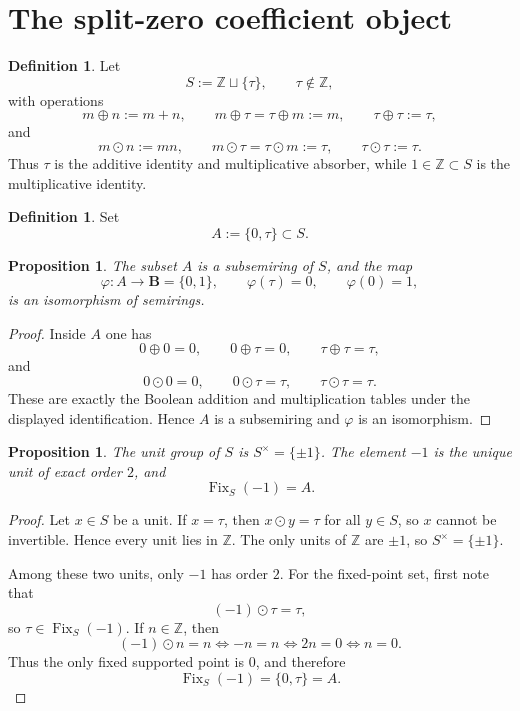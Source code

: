 \documentclass[11pt,a4paper]{article}
\newtheorem{proposition}[theorem]{Proposition}
\theoremstyle{definition}
\newtheorem{definition}[theorem]{Definition}
\theoremstyle{remark}
\DeclareMathOperator{\Fix}{Fix}
\newcommand{\ZZ}{\mathbb Z}
\newcommand{\BB}{\mathbf B}
\newcommand{\taup}{\tau}
\begin{document}
\section{The split-zero coefficient object}

\begin{definition}
Let
\[
S:=\ZZ\sqcup\{\taup\},\qquad \taup\notin \ZZ,
\]
with operations
\[
m\oplus n:=m+n,
\qquad
m\oplus\taup=\taup\oplus m:=m,
\qquad
\taup\oplus\taup:=\taup,
\]
and
\[
m\odot n:=mn,
\qquad
m\odot\taup=\taup\odot m:=\taup,
\qquad
\taup\odot\taup:=\taup.
\]
Thus $\taup$ is the additive identity and multiplicative absorber, while $1\in\ZZ\subset S$ is the multiplicative identity.
\end{definition}

\begin{definition}
Set
\[
A:=\{0,\taup\}\subset S.
\]
\end{definition}

\begin{proposition}\label{prop:boolean-pair}
The subset $A$ is a subsemiring of $S$, and the map
\[
\varphi:A\longrightarrow \BB=\{0,1\},
\qquad
\varphi(\taup)=0,
\qquad
\varphi(0)=1,
\]
is an isomorphism of semirings.
\end{proposition}

\begin{proof}
Inside $A$ one has
\[
0\oplus 0=0,
\qquad
0\oplus\taup=0,
\qquad
\taup\oplus\taup=\taup,
\]
and
\[
0\odot 0=0,
\qquad
0\odot\taup=\taup,
\qquad
\taup\odot\taup=\taup.
\]
These are exactly the Boolean addition and multiplication tables under the displayed identification.  Hence $A$ is a subsemiring and $\varphi$ is an isomorphism.
\end{proof}

\begin{proposition}\label{prop:units-fixed}
The unit group of $S$ is $S^\times=\{\pm 1\}$.  The element $-1$ is the unique unit of exact order $2$, and
\[
\Fix_S(-1)=A.
\]
\end{proposition}

\begin{proof}
Let $x\in S$ be a unit.  If $x=\taup$, then $x\odot y=\taup$ for all $y\in S$, so $x$ cannot be invertible.  Hence every unit lies in $\ZZ$.  The only units of $\ZZ$ are $\pm1$, so $S^\times=\{\pm1\}$.

Among these two units, only $-1$ has order $2$.  For the fixed-point set, first note that
\[
(-1)\odot\taup=\taup,
\]
so $\taup\in\Fix_S(-1)$.  If $n\in\ZZ$, then
\[
(-1)\odot n=n
\iff -n=n
\iff 2n=0
\iff n=0.
\]
Thus the only fixed supported point is $0$, and therefore
\[
\Fix_S(-1)=\{0,\taup\}=A.
\]
\end{proof}
\end{document}
